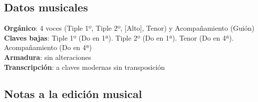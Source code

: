 \subsection*{Datos musicales}
\noindent \textbf{Orgánico}: 4 voces (Tiple 1º, Tiple 2º, [Alto], Tenor) y Acompañamiento (Guión)\\
\textbf{Claves bajas}: Tiple 1º (Do en 1ª). Tiple 2º (Do en 1ª). Tenor (Do en 4ª). Acompañamiento (Do en 4ª)\\
\textbf{Armadura}: sin alteraciones\\
\textbf{Transcripción}: a claves modernas sin transposición

\subsection*{Notas a la edición musical}
